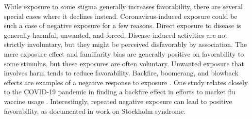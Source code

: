 \documentclass[review]{elsarticle}
\begin{document}


While exposure to some stigma generally increases favorability, there are several special cases where it declines instead.
Coronavirus-induced exposure could be such a case of negative exposure for a few reasons.
Direct exposure to disease is generally harmful, unwanted, and forced.
Disease-induced activities are not strictly involuntary,
but they might be perceived disfavorably by association.
The mere exposure effect\cite{robinson2005novel} and familiarity bias\cite{cao2011fear}
are generally positive on favorability to some stimulus,
but these exposures are often voluntary.
Unwanted exposure that involves harm tends to reduce favorability.
Backfire, boomerang, and blowback effects are examples of a negative response to exposure
\cite{swire2020searching, byrne2009boomerang, campagna2016strategic}.
One study relates closely to the COVID-19 pandemic in finding a backfire effect in efforts to market flu vaccine usage
\cite{nyhan2015does}.
Interestingly, repeated negative exposure can lead to positive favorability,
as documented in work on Stockholm syndrome\cite{julich2005stockholm}.
\end{document}
